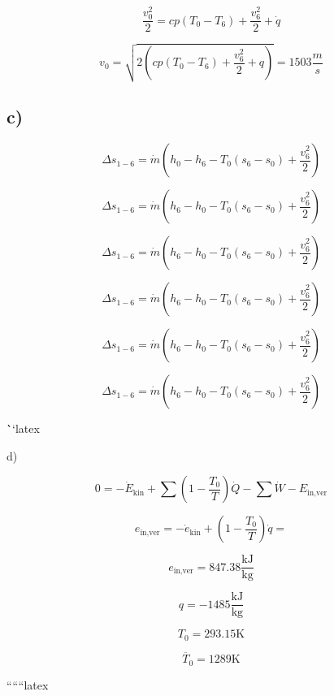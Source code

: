\[
\frac{v_0^2}{2} = cp \left( T_0 - T_6 \right) + \frac{v_6^2}{2} + \dot{q}
\]

\[
v_0 = \sqrt{2 \left( cp \left( T_0 - T_6 \right) + \frac{v_6^2}{2} + q \right)} = 1503 \frac{m}{s}
\]

\subsection*{c)}

\[
\Delta s_{1-6} = \dot{m} \left( h_0 - h_6 - T_0 \left( s_6 - s_0 \right) + \frac{v_6^2}{2} \right)
\]

\[
\Delta s_{1-6} = \dot{m} \left( h_6 - h_0 - T_0 \left( s_6 - s_0 \right) + \frac{v_6^2}{2} \right)
\]

\[
\Delta s_{1-6} = \dot{m} \left( h_6 - h_0 - T_0 \left( s_6 - s_0 \right) + \frac{v_6^2}{2} \right)
\]

\[
\Delta s_{1-6} = \dot{m} \left( h_6 - h_0 - T_0 \left( s_6 - s_0 \right) + \frac{v_6^2}{2} \right)
\]

\[
\Delta s_{1-6} = \dot{m} \left( h_6 - h_0 - T_0 \left( s_6 - s_0 \right) + \frac{v_6^2}{2} \right)
\]

\[
\Delta s_{1-6} = \dot{m} \left( h_6 - h_0 - T_0 \left( s_6 - s_0 \right) + \frac{v_6^2}{2} \right)
\]

\```latex


d) \quad {}

\[
0 = -\dot{E}_{\text{kin}} + \sum \left( 1 - \frac{T_0}{T} \right) \dot{Q} - \sum \dot{W} - E_{\text{in,ver}}
\]

\[
e_{\text{in,ver}} = -\dot{e}_{\text{kin}} + \left( 1 - \frac{T_0}{T} \right) \dot{q} = 
\]

\[
e_{\text{in,ver}} = 847.38 \frac{\text{kJ}}{\text{kg}}
\]

\[
q = -1485 \frac{\text{kJ}}{\text{kg}}
\]

\[
T_0 = 293.15 \text{K}
\]

\[
\overline{T}_0 = 1289 \text{K}
\]

``````latex


